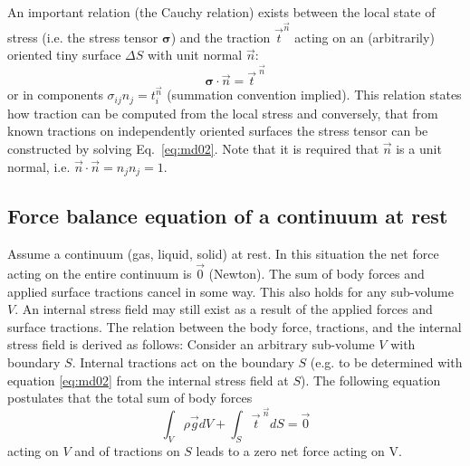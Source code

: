 
An important relation (the Cauchy relation) exists between the local state of stress (i.e.
the stress tensor ${\bm \sigma}$) 
and the traction $\vec{t}^{\vec n}$  acting on 
an (arbitrarily) oriented tiny surface $\Delta S$
with unit normal $\vec{n}$:
\begin{equation}
{\bm \sigma} \cdot \vec{n} = \vec{t}^{\; \vec n}
\label{eq:md02}
\end{equation}
or in components $\sigma_{ij} n_j = t_i^{\vec n}$ (summation convention implied).
This relation states how traction can be computed from the local stress and conversely,
that from known tractions on independently oriented surfaces the stress tensor can be
constructed by solving Eq.~\eqref{eq:md02}.
Note that it is required that $\vec{n}$ is a unit normal, i.e. $\vec{n}\cdot\vec{n}=n_jn_j=1$.

\vspace{0.5cm}
\vspace{0.5cm}

\subsection{Force balance equation of a continuum at rest} 

Assume a continuum (gas, liquid, solid)
at rest. In this situation the net force acting on the entire 
continuum is $\vec{0}$ (Newton). The
sum of body forces and applied surface tractions cancel in some way. 
This also holds for
any sub-volume $V$. An internal stress field may still exist 
as a result of the applied forces
and surface tractions. The relation between the body force, tractions, 
and the internal
stress field is derived as follows: 
Consider an arbitrary sub-volume $V$ with boundary $S$.
Internal tractions act on the boundary $S$ 
(e.g. to be determined with equation \eqref{eq:md02} from the
internal stress field at $S$). 
The following equation postulates that the total sum of body
forces
\begin{equation}
\int_V \rho \vec{g} dV + \int_S \vec{t}^{\; \vec n} dS = \vec{0}
\label{eq:md03}
\end{equation}
acting on $V$ and of tractions on $S$ leads to a zero net
force acting on V.


